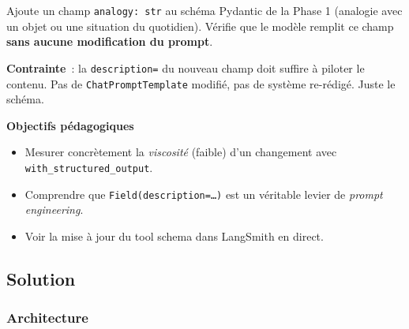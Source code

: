 \documentclass[11pt,a4paper]{article}
\begin{document}
\begin{tcolorbox}[title=Exercice bonus 3. Étendre un schéma Pydantic sans toucher au prompt]
Ajoute un champ \texttt{analogy: str} au schéma Pydantic de la Phase 1
(analogie avec un objet ou une situation du quotidien). Vérifie que le
modèle remplit ce champ \textbf{sans aucune modification du prompt}.

\textbf{Contrainte}~: la \texttt{description=} du nouveau champ doit
suffire à piloter le contenu. Pas de \texttt{ChatPromptTemplate} modifié,
pas de système re-rédigé. Juste le schéma.

\bigskip
\noindent\textbf{Objectifs pédagogiques}
\begin{itemize}[leftmargin=*]
  \item Mesurer concrètement la \emph{viscosité} (faible) d'un changement
        avec \texttt{with\_structured\_output}.
  \item Comprendre que \texttt{Field(description=\dots)} est un véritable
        levier de \emph{prompt engineering}.
  \item Voir la mise à jour du tool schema dans LangSmith en direct.
\end{itemize}
\end{tcolorbox}

\subsection{Solution}

\subsubsection{Architecture}

\begin{center}
\end{center}
\end{document}
